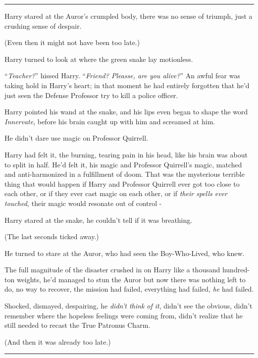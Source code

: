 \begin{center}\rule{3in}{0.4pt}\end{center}

Harry stared at the Auror's crumpled body, there was no sense of triumph, just a crushing sense of despair.

(Even then it might not have been too late.)

Harry turned to look at where the green snake lay motionless.

``\emph{Teacher?}'' hissed Harry. ``\emph{Friend? Pleasse, are you alive?}'' An awful fear was taking hold in Harry's heart; in that moment he had entirely forgotten that he'd just seen the Defense Professor try to kill a police officer.

Harry pointed his wand at the snake, and his lips even began to shape the word \emph{Innervate}, before his brain caught up with him and screamed at him.

He didn't dare use magic on Professor Quirrell.

Harry had felt it, the burning, tearing pain in his head, like his brain was about to split in half. He'd felt it, his magic and Professor Quirrell's magic, matched and anti-harmonized in a fulfillment of doom. That was the mysterious terrible thing that would happen if Harry and Professor Quirrell ever got too close to each other, or if they ever cast magic on each other, or if \emph{their spells ever touched,} their magic would resonate out of control -

Harry stared at the snake, he couldn't tell if it was breathing.

(The last seconds ticked away.)

He turned to stare at the Auror, who had seen the Boy-Who-Lived, who knew.

The full magnitude of the disaster crushed in on Harry like a thousand hundred-ton weights, he'd managed to stun the Auror but now there was nothing left to do, no way to recover, the mission had failed, everything had failed, \emph{he} had failed.

Shocked, dismayed, despairing, he \emph{didn't think of it}, didn't see the obvious, didn't remember where the hopeless feelings were coming from, didn't realize that he still needed to recast the True Patronus Charm.

(And then it was already too late.)

\begin{center}\rule{3in}{0.4pt}\end{center}

